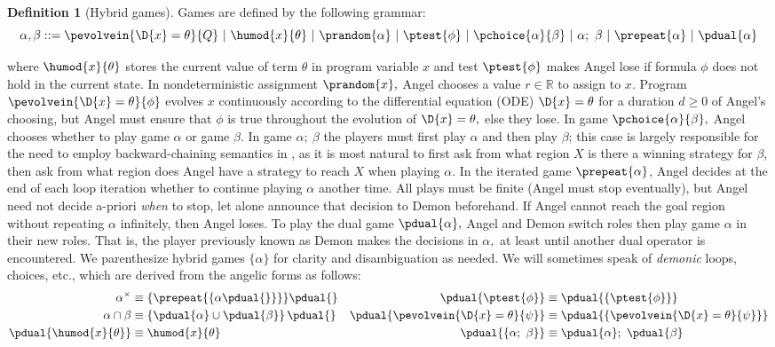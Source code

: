 \documentclass[12pt]{cmuthesis}
\theoremstyle{definition}
\newtheorem{definition}{Definition}
\theoremstyle{remark}
\newcommand{\bebecomes}{\mathrel{::=}}
\newcommand{\alternative}{~|~}
\newcommand{\ivr}{Q}
\begin{document}
\begin{definition}[Hybrid games]
Games are defined by the following grammar:  
\[\alpha,\beta \bebecomes \pevolvein{\D{x}=\theta}{\ivr} \alternative \humod{x}{\theta} \alternative \prandom{\alpha} \alternative \ptest{\phi} \alternative \pchoice{\alpha}{\beta} \alternative \alpha;~\beta \alternative \prepeat{\alpha} \alternative \pdual{\alpha}\]
\end{definition} 
where $\humod{x}{\theta}$ stores the current value of term $\theta$ in program variable $x$  and test $\ptest{\phi}$ makes Angel lose if formula $\phi$ does not hold in the current state.
In nondeterministic assignment $\prandom{x},$ Angel chooses a value $r \in \mathbb{R}$ to assign to $x$.
Program $\pevolvein{\D{x}=\theta}{\phi}$ evolves $x$ continuously according to the differential equation (ODE) $\D{x}=\theta$ for a duration $d \geq 0$ of Angel's choosing, but Angel must ensure that $\phi$ is true throughout the evolution of $\D{x}=\theta,$ else they lose.
In game $\pchoice{\alpha}{\beta},$ Angel chooses whether to play game $\alpha$ or game $\beta$.
In game $\alpha;~\beta$ the players must first play $\alpha$ and then play $\beta$; this case is largely responsible for the need to employ backward-chaining semantics in \dGL, as it is most natural to first ask from what region $X$ is there a winning strategy for $\beta$, then ask from what region does Angel have a strategy to reach $X$ when playing $\alpha$.
In the iterated game $\prepeat{\alpha}$, Angel decides at the end of each loop iteration whether to continue playing $\alpha$ another time.
All plays must be finite (Angel must stop eventually), but Angel need not decide a-priori \emph{when} to stop, let alone announce that decision to Demon beforehand.
If Angel cannot reach the goal region without repeating $\alpha$ infinitely, then Angel loses.
To play the dual game $\pdual{\alpha},$ Angel and Demon switch roles then play game $\alpha$ in their new roles.
That is, the player previously known as Demon makes the decisions in $\alpha,$ at least until another dual operator is encountered.
We parenthesize hybrid games $\{ \alpha \}$ for clarity and disambiguation as needed.
We will sometimes speak of \emph{demonic} loops, choices, etc., which are derived from the angelic forms as follows:
\begin{align*}
\alpha^\times &\equiv \{\prepeat{\{{\alpha{}\pdual{}}\}}\}{\pdual{}}                 & \pdual{\ptest{\phi}}      &\equiv \pdual{\{\ptest{\phi}\}}\\
\alpha \cap \beta  &\equiv \left\{\pdual{\alpha} \cup \pdual{\beta}\right\}\pdual{} & \pdual{\pevolvein{\D{x}=\theta}{\psi}} &\equiv \pdual{\{\pevolvein{\D{x}=\theta}{\psi}\}}\\
\pdual{\humod{x}{\theta}} &\equiv \humod{x}{\theta}                                      & \pdual{\{\alpha;~\beta\}} &\equiv \pdual{\alpha};~\pdual{\beta} 
\end{align*}
\end{document}
